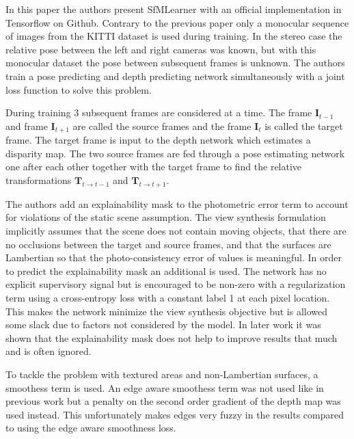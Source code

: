 
In this paper\cite{sfmlearner} the authors present SfMLearner with an official implementation in Tensorflow on Github. Contrary to the previous paper\cite{leftright} only a monocular sequence of images from the KITTI dataset is used during training. In the stereo case the relative pose between the left and right cameras was known, but with this monocular dataset the pose between subsequent frames is unknown. The authors train a pose predicting and depth predicting network simultaneously with a joint loss function to solve this problem.

During training 3 subsequent frames are considered at a time. The frame $\textbf{I}_{t-1}$ and frame $\textbf{I}_{t+1}$ are called the source frames and the frame $\textbf{I}_t$ is called the target frame. The target frame is input to the depth network which estimates a disparity map. The two source frames are fed through a pose estimating network one after each other together with the target frame to find the relative transformations $\textbf{T}_{t	\rightarrow t-1}$ and $\textbf{T}_{t	\rightarrow t+1}$.

The authors add an explainability mask to the photometric error term to account for violations of the static scene assumption. The view synthesis formulation implicitly assumes that the scene does not contain moving objects, that there are no occlusions between the target and source frames, and that the surfaces are Lambertian so that the photo-consistency error of \abbrRGB values is meaningful. In order to predict the explainability mask an additional \abbrCNN is used. The network has no explicit supervisory signal but is encouraged to be non-zero with a regularization term using a cross-entropy loss with a constant label 1 at each pixel location. This makes the network minimize the view synthesis objective but is allowed some slack due to factors not considered by the model. In later work it was shown that the explainability mask does not help to improve results that much and is often ignored.

To tackle the problem with textured areas and non-Lambertian surfaces, a smoothess term is used. An edge aware smoothess term was not used like in previous work\cite{leftright} but a penalty on the second order gradient of the depth map was used instead. This unfortunately makes edges very fuzzy in the results compared to using the edge aware smoothness loss.

